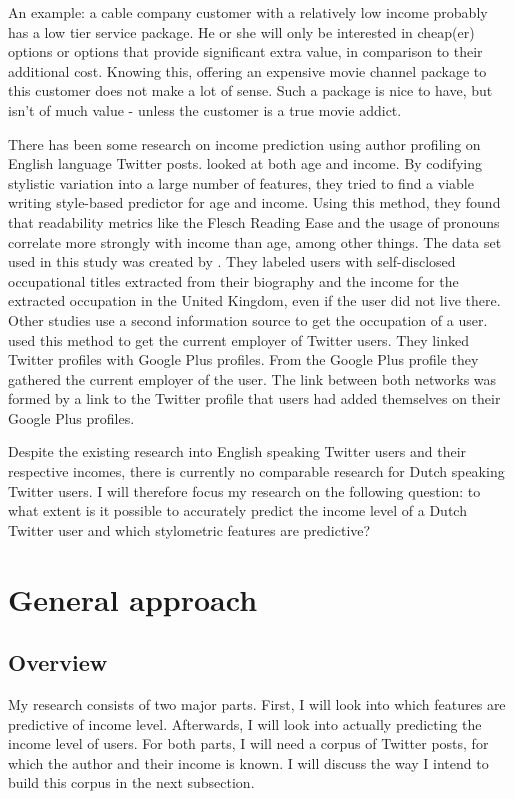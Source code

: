 \documentclass[11pt, a4paper]{article}
\begin{document}
An example: a cable company customer with a relatively low income probably has a low tier service package. He or she will only be interested in cheap(er) options or options that provide significant extra value, in comparison to their additional cost. Knowing this, offering an expensive movie channel package to this customer does not make a lot of sense. Such a package is nice to have, but isn't of much value - unless the customer is a true movie addict.

There has been some research on income prediction using author profiling on English language Twitter posts. \citet{flekova} looked at both age and income. By codifying stylistic variation into a large number of features, they tried to find a viable writing style-based predictor for age and income. Using this method, they found that readability metrics like the Flesch Reading Ease and the usage of pronouns correlate more strongly with income than age, among other things. The data set used in this study was created by \citet{pietro}. They labeled users with self-disclosed occupational titles extracted from their biography and the income for the extracted occupation in the United Kingdom, even if the user did not live there. Other studies use a second information source to get the occupation of a user. \citet{li} used this method to get the current employer of Twitter users. They linked Twitter profiles with Google Plus profiles. From the Google Plus profile they gathered the current employer of the user. The link between both networks was formed by a link to the Twitter profile that users had added themselves on their Google Plus profiles.

Despite the existing research into English speaking Twitter users and their respective incomes, there is currently no comparable research for Dutch speaking Twitter users. I will therefore focus my research on the following question: to what extent is it possible to accurately predict the income level of a Dutch Twitter user and which stylometric features are predictive?

\section{General approach}
\subsection{Overview}
My research consists of two major parts. First, I will look into which features are predictive of income level. Afterwards,  I will look into actually predicting the income level of users. For both parts, I will need a corpus of Twitter posts, for which the author and their income is known. I will discuss the way I intend to build this corpus in the next subsection. 
\end{document}
